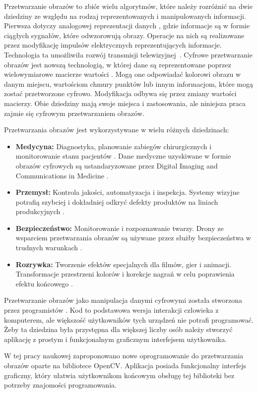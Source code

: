 
Przetwarzanie obrazów to zbiór wielu algorytmów, które należy rozróżnić na dwie dziedziny ze względu na rodzaj reprezentowanych i manipulowanych informacji.
Pierwsza dotyczy analogowej reprezentacji danych \cite{signalProcessing}, gdzie informacje są w formie ciągłych sygnałów, które odwzorowują obrazy. 
Operacje na nich są realizowane przez modyfikację impulsów elektrycznych reprezentujących informacje. 
Technologia ta umożliwiła rozwój transmisji telewizyjnej~\cite{times1926}.
Cyfrowe przetwarzanie obrazów \cite{digitalImageProcessing} jest nowszą technologią, w której dane są reprezentowane poprzez wielowymiarowe macierze wartości \cite{OpenCVMat}. 
Mogą one odpowiadać kolorowi obrazu w danym miejscu, wartościom chmury punktów lub innym informacjom, które mogą zostać przetworzone cyfrowo. 
Modyfikacja odbywa się przez zmiany wartości macierzy. 
Obie dziedziny mają swoje miejsca i zastosowania, ale niniejsza praca zajmie się cyfrowym przetwarzaniem obrazów.

Przetwarzania obrazów jest wykorzystywane w wielu różnych dziedzinach: 
\begin{itemize}
    \item \textbf{Medycyna:} Diagnostyka, planowanie zabiegów chirurgicznych i monitorowanie stanu pacjentów \cite{skszymon2023}. 
    Dane medyczne uzyskiwane w formie obrazów cyfrowych są ustandaryzowane przez Digital Imaging and Communications in Medicine \cite{DICOMPart01}.
    \item \textbf{Przemysł:} Kontrola jakości, automatyzacja i inspekcja. Systemy wizyjne potrafią szybciej i dokładniej odkryć defekty produktów na liniach produkcyjnych \cite{Nix2024}.
    \item \textbf{Bezpieczeństwo:} Monitorowanie i rozpoznawanie twarzy. Drony ze wsparciem przetwarzania obrazów są używane przez służby bezpieczeństwa w trudnych warunkach \cite{dji}.
    \item \textbf{Rozrywka:} Tworzenie efektów specjalnych dla filmów, gier i animacji. Transformacje przestrzeni kolorów i korekcje nagrań w celu poprawienia efektu końcowego \cite{cinema}.
\end{itemize}

Przetwarzanie obrazów jako manipulacja danymi cyfrowymi została stworzona przez programistów \cite{computerProcessing}. 
Kod to podstawowa wersja interakcji człowieka z komputerem, ale większość użytkowników tych urządzeń nie potrafi programować. 
Żeby ta dziedzina była przystępna dla większej liczby osób należy stworzyć aplikację z prostym i funkcjonalnym graficznym interfejsem użytkownika. 

W tej pracy naukowej zaproponowano nowe oprogramowanie do przetwarzania obrazów oparte na bibliotece OpenCV. 
Aplikacja posiada funkcjonalny interfejs graficzny, który ułatwia użytkownikom końcowym obsługę tej biblioteki bez potrzeby znajomości programowania.